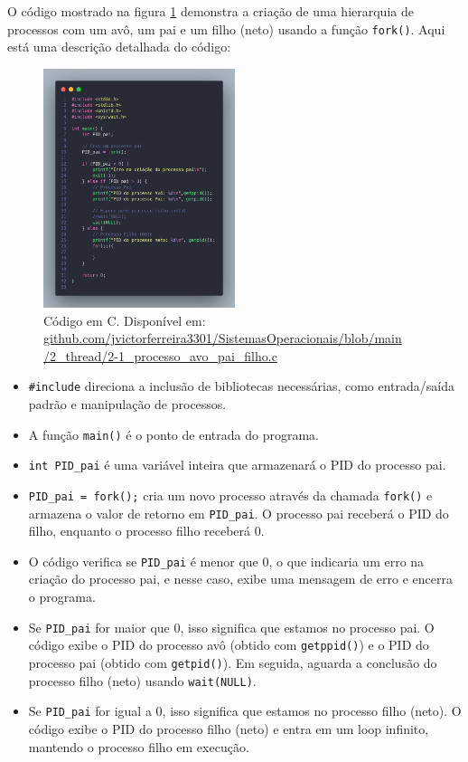 \documentclass[
	12pt,				%
	openright,			%
	oneside,			%
	a4paper,			%
	chapter=TITLE,		%
	english,			%
	french,				%
	spanish,			%
	brazil				%
	]{abntex2}
\theoremstyle{definition}
\begin{document}
O código mostrado na figura \ref{fig:proc1} demonstra a criação de uma hierarquia de processos 
com um avô, um pai e um filho (neto) usando a função \texttt{fork()}. 
Aqui está uma descrição detalhada do código:

\begin{figure}
    \centering
    \includegraphics[width=0.5\textwidth]{imagens/processos_1.png}
	\caption{Código em C. Disponível em: \href{https://github.com/jvictorferreira3301/Sistemas_Operacionais/blob/main/2_thread/2-1_processo_avo_pai_filho.c}{github.com/jvictorferreira3301/SistemasOperacionais/blob/main
    /2\_thread/2-1\_processo\_avo\_pai\_filho.c}}
	\label{fig:proc1}
\end{figure}


\begin{itemize}
    \item \texttt{\#include} direciona a inclusão de bibliotecas necessárias, como entrada/saída padrão e manipulação de processos.
    \item A função \texttt{main()} é o ponto de entrada do programa.
    \item \texttt{int PID\_pai} é uma variável inteira que armazenará o PID do processo pai.
    \item \texttt{PID\_pai = fork();} cria um novo processo através da chamada \texttt{fork()} e armazena o valor de retorno em \texttt{PID\_pai}. O processo pai receberá o PID do filho, enquanto o processo filho receberá 0. 
    \item O código verifica se \texttt{PID\_pai} é menor que 0, o que indicaria um erro na criação do processo pai, e nesse caso, exibe uma mensagem de erro e encerra o programa.
    \item Se \texttt{PID\_pai} for maior que 0, isso significa que estamos no processo pai. O código exibe o PID do processo avô (obtido com \texttt{getppid()}) e o PID do processo pai (obtido com \texttt{getpid()}). Em seguida, aguarda a conclusão do processo filho (neto) usando \texttt{wait(NULL)}.
    \item Se \texttt{PID\_pai} for igual a 0, isso significa que estamos no processo filho (neto). O código exibe o PID do processo filho (neto) e entra em um loop infinito, mantendo o processo filho em execução.
\end{itemize}
\end{document}
